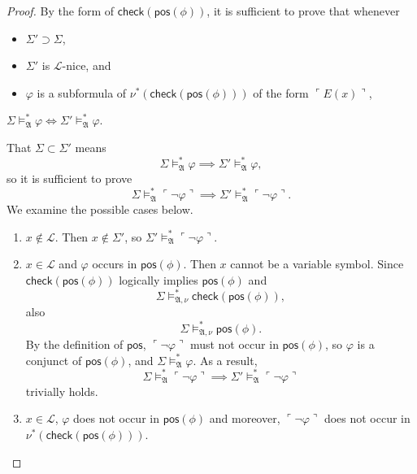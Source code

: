 \documentclass[12pt, twoside]{memoir}
\numberwithin{equation}{section}
\theoremstyle{definition}
\theoremstyle{remark}
\theoremstyle{definition}
\theoremstyle{definition}
\theoremstyle{definition}
\theoremstyle{remark}
\begin{document}
\begin{proof}
By the form of $\mathsf{check}(\mathsf{pos}(\phi))$, it is sufficient to prove that whenever 
\begin{itemize}
    \item $\Sigma' \supset \Sigma$,
    \item $\Sigma'$ is $\mathcal{L}$-nice, and
    \item $\varphi$ is a subformula of $\nu^*(\mathsf{check}(\mathsf{pos}(\phi)))$ of the form $\ulcorner E(x) \urcorner$,
\end{itemize}
 $\Sigma \models^*_{\mathfrak{A}} \varphi \iff \Sigma' \models^*_{\mathfrak{A}} \varphi$. 
 
That $\Sigma \subset \Sigma'$ means $$\Sigma \models^*_{\mathfrak{A}} \varphi \implies \Sigma' \models^*_{\mathfrak{A}} \varphi,$$ so it is sufficient to prove $$\Sigma \models^*_{\mathfrak{A}} \ulcorner \neg \varphi \urcorner \implies \Sigma' \models^*_{\mathfrak{A}} \ulcorner \neg \varphi \urcorner.$$ We examine the possible cases below.
\begin{enumerate}[label=Case \arabic*:, leftmargin=50pt]
    \item $x \not\in \mathcal{L}$. Then $x \not\in \Sigma'$, so $\Sigma' \models^*_{\mathfrak{A}} \ulcorner \neg \varphi \urcorner$.
    \item\label{5136c2} $x \in \mathcal{L}$ and $\varphi$ occurs in $\mathsf{pos}(\phi)$. Then $x$ cannot be a variable symbol. Since $\mathsf{check}(\mathsf{pos}(\phi))$ logically implies $\mathsf{pos}(\phi)$ and $$\Sigma \models^*_{\mathfrak{A}, \nu} \mathsf{check}(\mathsf{pos}(\phi)),$$ also $$\Sigma \models^*_{\mathfrak{A}, \nu} \mathsf{pos}(\phi).$$ By the definition of $\mathsf{pos}$, $\ulcorner \neg \varphi \urcorner$ must not occur in $\mathsf{pos}(\phi)$, so $\varphi$ is a conjunct of $\mathsf{pos}(\phi)$, and $\Sigma \models^*_{\mathfrak{A}} \varphi$. As a result, $$\Sigma \models^*_{\mathfrak{A}} \ulcorner \neg \varphi \urcorner \implies \Sigma' \models^*_{\mathfrak{A}} \ulcorner \neg \varphi \urcorner$$ trivially holds.
    \item $x \in \mathcal{L}$, $\varphi$ does not occur in $\mathsf{pos}(\phi)$ and moreover, $\ulcorner \neg \varphi \urcorner$ does not occur in $\nu^*(\mathsf{check}(\mathsf{pos}(\phi)))$. 
    

\end{enumerate}
\end{proof}
\end{document}
